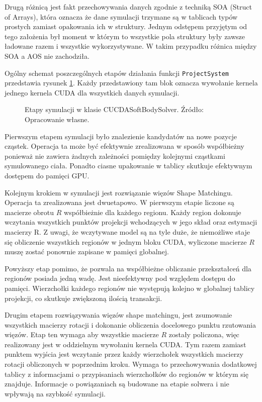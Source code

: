 {Drugą różnicą jest fakt przechowywania danych zgodnie z techniką SOA (Struct of
		Arrays), która oznacza że dane symulacji trzymane są w tablicach typów prostych
zamiast opakowania ich w struktury. Jednym odstępem przyjętym od tego założenia
był moment w którym to wszystkie pola struktury były zawsze ładowane razem i
wszystkie wykorzystywane. W takim przypadku różnica między SOA a AOS nie
zachodziła.

Ogólny schemat poszczególnych etapów działania funkcji \texttt{ProjectSystem}
przedstawia rysunek \ref{flow-gpu}. Każdy przedstawiony tam blok oznacza
wywołanie kernela jednego kernela CUDA dla wszystkich danych symulacji.

\begin{figure}[H]
\centering

\caption{Etapy symulacji w klasie CUCDASoftBodySolver. Źródło: Opracowanie własne.}
\label{flow-gpu}
\end{figure}

Pierwszym etapem symulacji było znalezienie kandydatów na nowe pozycje cząstek.
Operacja ta może być efektywnie zrealizowana w sposób współbieżny ponieważ nie zawiera żadnych
zależności pomiędzy kolejnymi cząstkami symulowanego ciała. Ponadto ciasne
upakowanie w tablicy skutkuje efektywnym dostępem do pamięci GPU.

Kolejnym krokiem w symulacji jest rozwiązanie więzów Shape Matchingu. Operacja
ta zrealizowana jest dwuetapowo. W pierwszym etapie liczone są macierze obrotu
$R$ współbieżnie dla każdego regionu. Każdy region dokonuje wczytania wszystkich
punktów projekcji wchodzących w jego skład oraz estymacji macierzy R. Z uwagi,
że wczytywane model są na tyle duże, że niemożliwe staje się obliczenie
wszystkich regionów w jednym bloku CUDA, wyliczone macierze $R$ muszę zostać
ponownie zapisane w pamięci globalnej.

Powyższy etap pomimo, że pozwala na współbieżne obliczanie przekształceń dla
regionów posiada jedną wadę. Jest nieefektywny pod względem dostępu do pamięci.
Wierzchołki każdego regionów nie występują kolejno w globalnej tablicy
projekcji, co skutkuje zwiększoną ilością transakcji.

Drugim etapem rozwiązywania więzów shape matchingu, jest zsumowanie wszystkich
macierzy rotacji i dokonanie obliczenia docelowego punktu rzutowania więzów. Etap
ten wymaga aby wszystkie macierze $R$ zostały policzona, więc realizowany jest w
oddzielnym wywołaniu kernela CUDA. Tym razem zamiast punktem wyjścia jest
wczytanie przez każdy wierzchołek wszystkich macierzy rotacji obliczonych w
poprzednim kroku. Wymaga to przechowywania dodatkowej tablicy z informacjami o 
przypisaniach wierzchołków do regionów w którym się znajduje. Informacje o
powiązaniach są budowane na etapie solwera i nie wpływają na szybkość symulacji.

}
